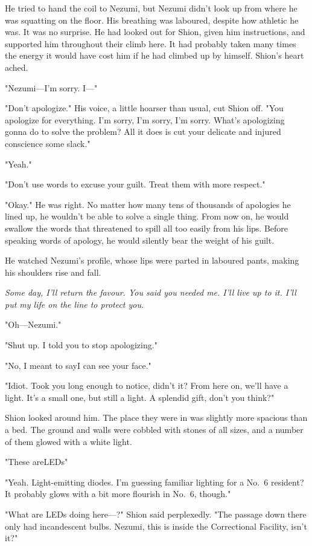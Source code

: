 He tried to hand the coil to Nezumi, but Nezumi didn't look up from
where he was squatting on the floor. His breathing was laboured, despite
how athletic he was. It was no surprise. He had looked out for Shion,
given him instructions, and supported him throughout their climb here.
It had probably taken many times the energy it would have cost him if he
had climbed up by himself. Shion's heart ached.

"Nezumi---I'm sorry. I---"

"Don't apologize." His voice, a little hoarser than usual, cut Shion
off. "You apologize for everything. I'm sorry, I'm sorry, I'm sorry.
What's apologizing gonna do to solve the problem? All it does is cut
your delicate and injured conscience some slack."

"Yeah."

"Don't use words to excuse your guilt. Treat them with more respect."

"Okay." He was right. No matter how many tens of thousands of apologies
he lined up, he wouldn't be able to solve a single thing. From now on,
he would swallow the words that threatened to spill all too easily from
his lips. Before speaking words of apology, he would silently bear the
weight of his guilt.

He watched Nezumi's profile, whose lips were parted in laboured pants,
making his shoulders rise and fall.

\emph{Some day, I'll return the favour. You said you needed me. I'll live up
to it. I'll put my life on the line to protect you.}

"Oh---Nezumi."

"Shut up. I told you to stop apologizing."

"No, I meant to say\el I can see your face."

"Idiot. Took you long enough to notice, didn't it? From here on, we'll
have a light. It's a small one, but still a light. A splendid gift,
don't you think?"

Shion looked around him. The place they were in was slightly more
spacious than a bed. The ground and walls were cobbled with stones of
all sizes, and a number of them glowed with a white light.

"These are\el LEDs\el "

"Yeah. Light-emitting diodes. I'm guessing familiar lighting for a No.~6
resident? It probably glows with a bit more flourish in No.~6, though."

"What are LEDs doing here---?" Shion said perplexedly. "The passage down
there only had incandescent bulbs. Nezumi, this is inside the
Correctional Facility, isn't it?"

